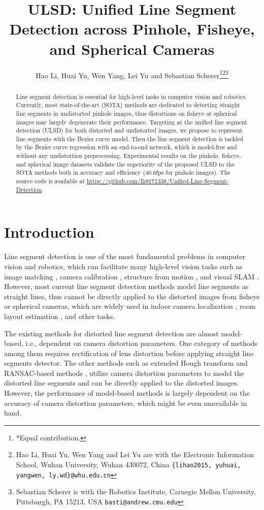 \documentclass[letterpaper, 10 pt, conference]{ieeeconf}
\title{\LARGE \bf
ULSD: Unified Line Segment Detection across Pinhole, Fisheye, and Spherical Cameras
}
\author{Hao Li, Huai Yu, Wen Yang, Lei Yu and Sebastian Scherer\thanks{*Equal contribution.}\thanks{Hao Li, Huai Yu, Wen Yang and Lei Yu are with the Electronic Information School, Wuhan University,  Wuhan 430072, China {\tt\small \{lihao2015, yuhuai, yangwen, ly.wd\}@whu.edu.cn}}\thanks{Sebastian Scherer is with the Robotics Institute, Carnegie Mellon University,
	Pittsburgh, PA 15213, USA
	{\tt\small basti@andrew.cmu.edu}}}
\begin{document}
\maketitle
\thispagestyle{empty}
\pagestyle{empty}


\begin{abstract}
	Line segment detection is essential for high-level tasks in computer vision and robotics. Currently, most state-of-the-art (SOTA) methods are dedicated to detecting straight line segments in undistorted pinhole images, thus distortions on fisheye or spherical images may largely degenerate their performance. Targeting at the unified line segment detection (ULSD) for both distorted and undistorted images, we propose to represent line segments with the Bezier curve model. Then the line segment detection is tackled by the Bezier curve regression with an end-to-end network, which is model-free and without any undistortion preprocessing. Experimental results on the pinhole, fisheye, and spherical image datasets validate the superiority of the proposed ULSD to the SOTA methods both in accuracy and efficiency (40.6fps for pinhole images). The source code is available at \href{https://github.com/lh9171338/Unified-Line-Segment-Detection}{https://github.com/lh9171338/Unified-Line-Segment-Detection}.  
	
\end{abstract}

\section{Introduction} \label{sec1}
Line segment detection is one of the most fundamental problems in computer vision and robotics, which can facilitate many high-level vision tasks such as image matching \cite{ImageMatching}, camera calibration \cite{FisheyeRectification3,FisheyeRectification4},  structure from motion \cite{SfM1,SfM2}, and visual SLAM \cite{StructVIO,vSLAM1,vSLAM2, yu2020IROS}. However, most current line segment detection methods model line segments as straight lines, thus cannot be directly applied to the distorted images from fisheye 
or spherical cameras, which are widely used in indoor camera localization \cite{IndoorLocalization1, IndoorLocalization2}, room layout estimation \cite{Layout1, Layout2}, and other tasks.

The existing methods for distorted line segment detection are almost model-based, i.e., dependent on camera distortion parameters. One category of methods among them requires rectification of lens distortion before applying straight line segments detector. The other methods such as extended Hough transform \cite{FisheyeRectification1} and RANSAC-based methods \cite{FisheyeRectification2}, utilize camera distortion parameters to model the distorted line segments and can be directly applied to the distorted images. However, the performance of model-based methods is largely dependent on the accuracy of camera distortion parameters, which might be even unavailable in hand.
\end{document}
